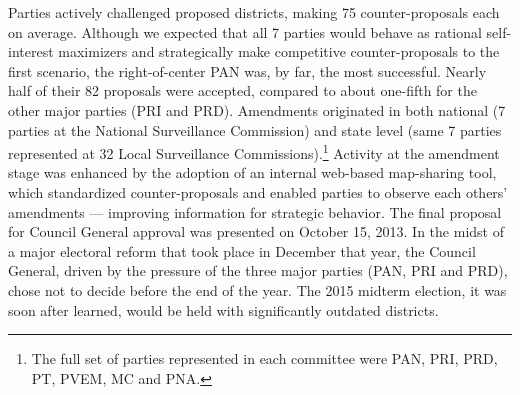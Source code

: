 \documentclass[letter,12pt]{article}
\begin{document}


Parties actively challenged proposed districts, making 75 counter-proposals each on average. Although we expected that all 7 parties would behave as rational self-interest maximizers and strategically make competitive counter-proposals to the first scenario, the right-of-center PAN was, by far, the most successful. Nearly half of their 82 proposals were accepted, compared to about one-fifth for the other major parties (PRI and PRD). Amendments originated in both national (7 parties at the National Surveillance Commission) and state level (same 7 parties represented at 32 Local Surveillance Commissions).\footnote{The full set of parties represented in each committee were PAN, PRI, PRD, PT, PVEM, MC and PNA.} Activity at the amendment stage was enhanced by the adoption of an internal web-based map-sharing tool, which standardized counter-proposals and enabled parties to observe each others' amendments --- improving information for strategic behavior. The final proposal for Council General approval was presented on October 15, 2013. In the midst of a major electoral reform that took place in December that year, the Council General, driven by the pressure of the three major parties (PAN, PRI and PRD), chose not to decide before the end of the year. The 2015 midterm election, it was soon after learned, would be held with significantly outdated districts. 

\end{document}
